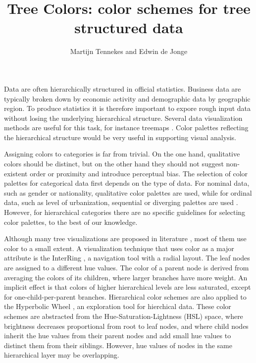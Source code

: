 \documentclass[journal]{vgtc}                %
\title{Tree Colors: color schemes for tree structured data}
\author{Martijn Tennekes and Edwin de Jonge}
\begin{document}
\lstset{language=R}


\maketitle

Data are often hierarchically structured in official statistics. Business data are typically broken down by economic activity and demographic data by geographic region. To produce statistics it is therefore important to expore rough input data without losing the underlying hierarchical structure. Several data visualization methods are useful for this task, for instance treemaps
\cite{shneiderman1992,tennekes2011b}. Color palettes reflecting the hierarchical structure would be very useful in supporting visual analysis.

Assigning colors to categories is far from trivial. On the one hand, qualitative colors should be distinct, but on the other hand they should not suggest non-existent order or proximity and introduce perceptual bias. The selection of color palettes for categorical data first depends on the type of data. For nominal data, such as gender or nationality, qualitative color palettes are used, while for ordinal data, such as level of urbanization, sequential or diverging palettes are used \cite{brewer03, zeileis2009}. However, for hierarchical categories there are no specific guidelines for selecting color palettes, to the best of our knowledge.

Although many tree visualizations are proposed in literature \cite{schulz2011}, most of them use color to a small extent. A visualization technique that uses color as a major attribute is the InterRing \cite{yang2002}, a navigation tool with a radial layout. The leaf nodes are assigned to a different hue values. The color of a parent node is derived from averaging the colors of its children, where larger branches have more weight. An implicit effect is that colors of higher hierarchical levels are less saturated, except for one-child-per-parent branches. Hierarchical color schemes are also applied to the Hyperbolic Wheel \cite{lam2012}, an exploration tool for hierchical data.  These color schemes are abstracted from the Hue-Saturation-Lightness (HSL) space, where brightness decreases proportional from root to leaf nodes, and where child nodes inherit the hue values from their parent nodes and add small hue values to distinct them from their siblings. However, hue values of nodes in the same hierarchical layer may be overlapping.
\end{document}

